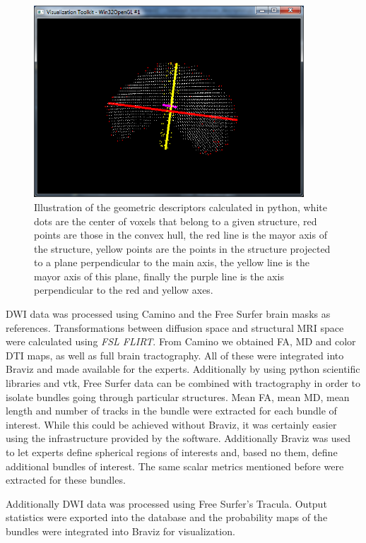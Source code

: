 \begin{figure}
	\centering
		\includegraphics[width=0.9\textwidth]{figures/kmc400/desc_4}
	\caption{Illustration of the geometric descriptors calculated in python, white dots are the center of voxels that belong to a given structure, red points are those in the convex hull, the red line is the mayor axis of the structure, yellow points are the points in the structure projected to a plane perpendicular to the main axis, the yellow line is the mayor axis of this plane, finally the purple line is the axis perpendicular to the red and yellow axes.}
	\label{fig_jth_descs}
\end{figure}

DWI data was processed using Camino and the Free Surfer brain masks as references. Transformations between diffusion space and structural MRI space were calculated using \emph{FSL FLIRT}. From Camino we obtained FA, MD and color DTI maps, as well as full brain tractography. All of these were integrated into Braviz and made available for the experts. Additionally by using python scientific libraries and vtk, Free Surfer data can be combined with tractography in order to isolate bundles going through particular structures. Mean FA, mean MD, mean length and number of tracks in the bundle were extracted for each bundle of interest.  While this could be achieved without Braviz, it was certainly easier using the infrastructure provided by the software. Additionally Braviz was used to let experts define spherical regions of interests and, based no them, define additional bundles of interest. The same scalar metrics mentioned before were extracted for these bundles. 

Additionally DWI data was processed using Free Surfer's Tracula. Output statistics were exported into the database and the probability maps of the bundles were integrated into Braviz for visualization. 

